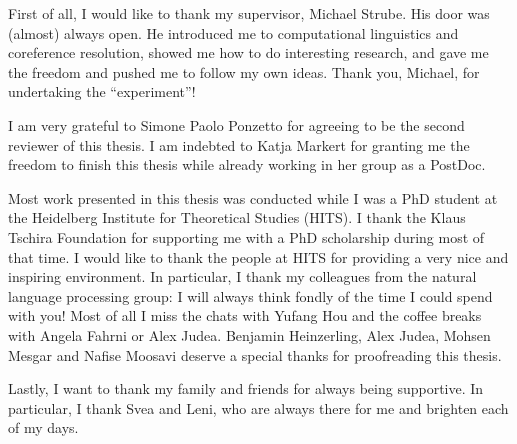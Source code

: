 
First of all, I would like to thank my supervisor, Michael Strube. His door was (almost) always open. He introduced me to computational linguistics and coreference resolution, showed me how to do interesting research, and gave me the freedom and pushed me to follow my own ideas. Thank you, Michael, for undertaking the ``experiment''!

I am very grateful to Simone Paolo Ponzetto for agreeing to be the second reviewer of this thesis. I am indebted to Katja Markert for granting me the freedom to finish this thesis while already working in her group as a PostDoc.

Most work presented in this thesis was conducted while I was a PhD student at the Heidelberg Institute for Theoretical Studies (HITS). I thank the Klaus Tschira Foundation for supporting me with a PhD scholarship during most of that time. I would like to thank the people at HITS for providing a very nice and inspiring environment. In particular, I thank my colleagues from the natural language processing group: I will always think fondly of the time I could spend with you! Most of all I miss the chats with Yufang Hou and the coffee breaks with Angela Fahrni or Alex Judea. Benjamin Heinzerling, Alex Judea, Mohsen Mesgar and Nafise Moosavi deserve a special thanks for proofreading this thesis.

Lastly, I want to thank my family and friends for always being supportive. In particular, I thank Svea and Leni, who are always there for me and brighten each of my days.
